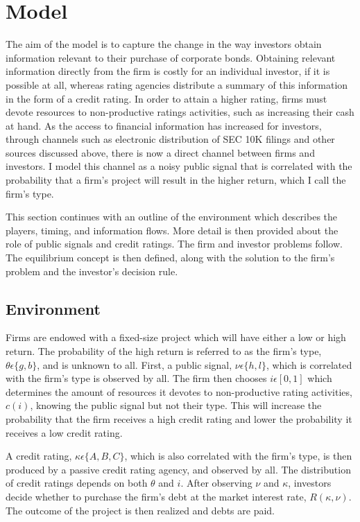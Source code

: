 \documentclass[notitlepage]{article}
\begin{document}
\section{Model}
\label{sec:mod}
The aim of the model is to capture the change in the way investors obtain information relevant to their purchase of corporate bonds. Obtaining relevant information directly from the firm is costly for an individual investor, if it is possible at all, whereas rating agencies distribute a summary of this information in the form of a credit rating. In order to attain a higher rating, firms must devote resources to non-productive ratings activities, such as increasing their cash at hand. As the access to financial information has increased for investors, through channels such as electronic distribution of SEC 10K filings and other sources discussed above, there is now a direct channel between firms and investors. I model this channel as a noisy public signal that is correlated with the probability that a firm's project will result in the higher return, which I call the firm's type. 

This section continues with an outline of the environment which describes the players, timing, and information flows. More detail is then provided about the role of public signals and credit ratings. The firm and investor problems follow. The equilibrium concept is then defined, along with the solution to the firm's problem and the investor's decision rule.

\subsection{Environment}
Firms are endowed with a fixed-size project which will have either a low or high return. The probability of the high return is referred to as the firm's type, $\theta \epsilon \{g,b\}$, and is unknown to all. First, a public signal, $\nu \epsilon \{h,l\}$, which is correlated with the firm's type is observed by all. The firm then chooses $i \epsilon [0,1]$ which determines the amount of resources it devotes to non-productive rating activities, $c(i)$, knowing the public signal but not their type. This will increase the probability that the firm receives a high credit rating and lower the probability it receives a low credit rating.

A credit rating, $\kappa \epsilon \{A,B,C\}$, which is also correlated with the firm's type, is then produced by a passive credit rating agency, and observed by all. The distribution of credit ratings depends on both $\theta$ and $i$. After observing $\nu$ and $\kappa$, investors decide whether to purchase the firm's debt at the market interest rate, $R(\kappa,\nu)$. The outcome of the project is then realized and debts are paid.
\end{document}
